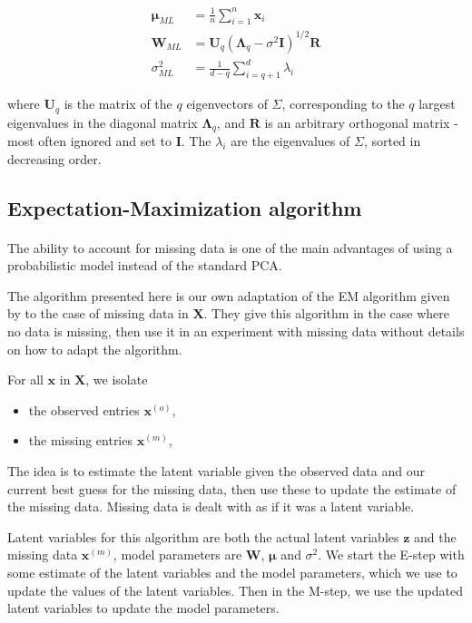 \documentclass{article}
\begin{document}
\begin{align}
    \label{eq:ppca_mu_ml}
    \boldsymbol{\mu}_{ML} &= \frac{1}{n} \sum_{i=1}^n \mathbf{x}_i \\
    \label{eq:ppca_W_ml}
    \mathbf{W}_{ML} &= \mathbf{U}_q \left(\mathbf{\Lambda}_q - \sigma^2\mathbf{I}\right)^{1/2} \mathbf{R} \\
    \label{eq:ppca_sigma_ml}
    \sigma^2_{ML} &= \frac{1}{d-q} \sum_{i=q+1}^d \lambda_i
\end{align}

where $\mathbf{U}_q$ is the matrix of the $q$ eigenvectors of $\Sigma$, corresponding to the $q$ largest eigenvalues in the diagonal matrix $\mathbf{\Lambda}_q$, and $\mathbf{R}$ is an arbitrary orthogonal matrix - most often ignored and set to $\mathbf{I}$. The $\lambda_i$ are the eigenvalues of $\Sigma$, sorted in decreasing order.

\subsection{Expectation-Maximization algorithm}
\label{sec:ppca_em}

\paragraph{} The ability to account for missing data is one of the main advantages of using a probabilistic model instead of the standard PCA.

The algorithm presented here is our own adaptation of the EM algorithm given by \citet{PPCA} to the case of missing data in $\mathbf{X}$. They give this algorithm in the case where no data is missing, then use it in an experiment with missing data without details on how to adapt the algorithm.

For all $\mathbf{x}$ in $\mathbf{X}$, we isolate
\begin{itemize}
    \item the observed entries $\mathbf{x}^{(o)}$,
    \item the missing entries $\mathbf{x}^{(m)}$,
\end{itemize}

The idea is to estimate the latent variable given the observed data and our current best guess for the missing data, then use these to update the estimate of the missing data. Missing data is dealt with as if it was a latent variable.

Latent variables for this algorithm are both the actual latent variables $\mathbf{z}$ and the missing data $\mathbf{x}^{(m)}$, model parameters are $\mathbf{W}$, $\boldsymbol{\mu}$ and $\sigma^2$. We start the E-step with some estimate of the latent variables and the model parameters, which we use to update the values of the latent variables. Then in the M-step, we use the updated latent variables to update the model parameters.
\end{document}
